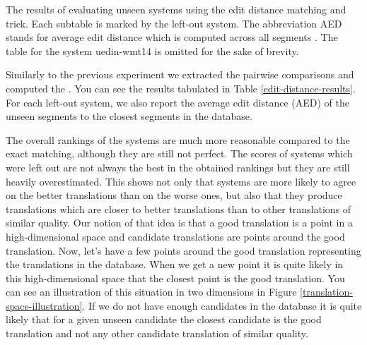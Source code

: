 \begin{table}
\caption[Results of evaluating unseen systems by edit distance matching]{The results of
  evaluating unseen systems using the edit distance matching and
   trick. Each subtable is marked by the left-out system.
  The abbreviation AED stands for average edit distance which is computed
across all segments . The table for the system uedin-wmt14 is omitted for the sake
of brevity.}

  \label{edit-distance-results}
\end{table}

Similarly to the previous experiment we extracted the pairwise comparisons and
computed the . You can see the results
tabulated in Table \ref{edit-distance-results}. For each left-out system,
we also report the average edit distance (AED) of the unseen segments to the closest
segments in the database.

The overall rankings of the systems are much more reasonable compared to the
exact matching, although they are still not perfect. The scores of systems
which were left out are not always the best in the obtained rankings but they
are still heavily overestimated. This shows not only that systems are more
likely to agree on the better translations than on the worse ones, but also
that they produce translations which are closer to better translations than to
other translations of similar quality. Our notion of that idea is that a good
translation is a point  in a high-dimensional space and candidate translations
are points around the good translation. Now, let's have a few points around the
good translation representing the translations in the database. When we get a
new point it is quite likely in this high-dimensional space that the closest
point is the good translation. You can see an illustration of this situation in
two dimensions in Figure \ref{translation-space-illustration}.  If we do not have enough candidates in the
database it is quite likely that for a given unseen candidate the closest
candidate is the good translation and not any other candidate translation of
similar quality. 

